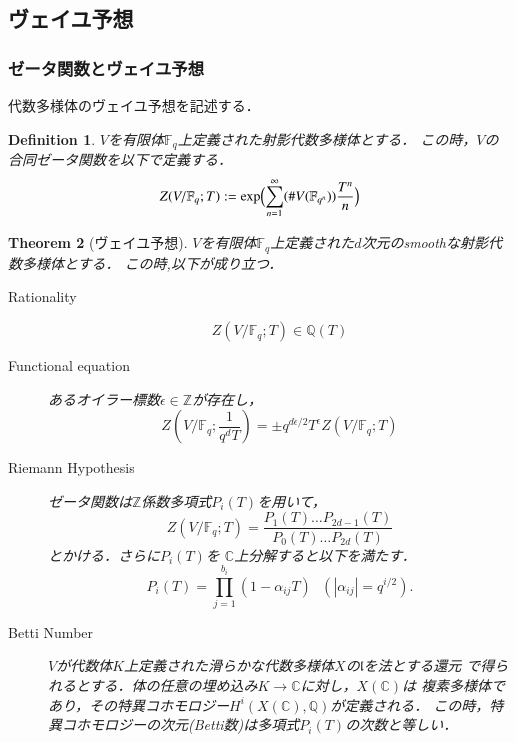 \documentclass{ujarticle}
\newtheorem{thm}{Theorem}[section]
\newtheorem{dfn}[thm]{Definition}
\begin{document}
\subsection{ヴェイユ予想}
\label{sub:ヴェイユ予想}
\subsubsection{ゼータ関数とヴェイユ予想}
\label{subs:ゼータ関数とヴェイユ予想}

代数多様体のヴェイユ予想を記述する．
\begin{dfn}
    $V$を有限体$\mathbb{F}_q$上定義された射影代数多様体とする．
    この時，$V$の合同ゼータ関数を以下で定義する．
    \begin{equation*}
     Z(V/\mathbb{F}_q;T):= \mathrm{exp}\Bigl( \sum_{n=1}^{\infty}(\#V(\mathbb{F}_{q^n}))\frac{T^n}{n} \Bigr)
    \end{equation*}
\end{dfn}



\begin{thm}[ヴェイユ予想]
  $V$を有限体$\mathbb{F}_q$上定義された$d$次元のsmoothな射影代数多様体とする．
  この時,以下が成り立つ．
  \begin{description}
    \item[Rationality]
    \begin{equation*}
      Z(V/\mathbb{F}_q;T) \in \mathbb{Q}(T)
    \end{equation*}
    \item[Functional equation]
    あるオイラー標数$ \epsilon \in \mathbb{Z}$が存在し，
    \begin{equation}
      Z(V/\mathbb{F}_q;\frac{1}{q^dT})=\pm
      q^{d \epsilon/2}T^{\epsilon}Z(V/\mathbb{F}_q;T)
    \end{equation}
    \item[Riemann Hypothesis]
    ゼータ関数は$\mathbb{Z}$係数多項式$P_i(T)$を用いて，
    \begin{equation}
     Z(V/\mathbb{F}_q;T)=
     \frac{P_1(T)\dots P_{2d-1}(T)}{P_0(T)\dots P_{2d}(T)}
    \end{equation}
    とかける．さらに$P_i(T)$を
    $ \mathbb{C} $上分解すると以下を満たす．
    \begin{equation*}
     P_i(T)= \prod_{j=1}^{b_i}(1-\alpha_{ij}T) \mbox{ }
      (|\alpha_{ij}|=q^{i/2}).
    \end{equation*}
    \item[Betti Number]
    $V$が代数体$K$上定義された滑らかな代数多様体$X$の$\mathfrak{l}$を法とする還元
    で得られるとする．体の任意の埋め込み$K \to \mathbb{C}$に対し，$X(\mathbb{C})$は
    複素多様体であり，その特異コホモロジー$H^i(X(\mathbb{C}),\mathbb{Q})$が定義される．
    この時，特異コホモロジーの次元(Betti数)は多項式$P_i(T)$の次数と等しい．
  \end{description}
\end{thm}
\end{document}
